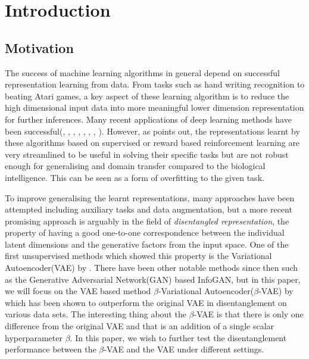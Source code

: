 \chapter{Introduction} \label{ch:introduction}

    \section{Motivation}
        The success of machine learning algorithms in general depend on successful representation learning from data. From tasks such as hand writing recognition\citep{lecun1998gradient} to beating Atari games\citep{mnih2013playing}, a key aspect of these learning algorithm is to reduce the high dimensional input data into more meaningful lower dimension representation for further inferences. Many recent applications of deep learning methods have been successful(\cite{he2016deep}, \cite{szegedy2015going}, \cite{gregor2015draw}, \cite{van2016wavenet}, \cite{van2016conditional}, \cite{mnih2015human}, \cite{jaderberg2016reinforcement}, \cite{silver2016mastering}). However, as \cite{burgess2018understanding} points out, the representations learnt by these algorithms based on supervised or reward based reinforcement learning are very streamlined to be useful in solving their specific tasks but are not robust enough for generalising and domain transfer compared to the biological intelligence\citep{lake2017building}. This can be seen as a form of overfitting to the given task.
        
        To improve generalising the learnt representations, many approaches have been attempted including auxiliary tasks\citep{jaderberg2016reinforcement} and data augmentation\citep{tobin2017domain}, but a more recent promising approach is arguably in the field of \textit{disentangled representation}, the property of having a good one-to-one correspondence between the individual latent dimensions and the generative factors from the input space. One of the first unsupervised methods which showed this property is the Variational Autoencoder(VAE) by \cite{kingma2013auto}. There have been other notable methods since then such as the Generative Adversarial Network(GAN) based InfoGAN\citep{chen2016infogan}, but in this paper, we will focus on the VAE based method $\beta$-Variational Autoencoder($\beta$-VAE) by \cite{higgins2017beta} which has been shown to outperform the original VAE in disentanglement on various data sets. The interesting thing about the $\beta$-VAE is that there is only one difference from the original VAE and that is an addition of a single scalar hyperparameter $\beta$. In this paper, we wish to further test the disentanglement performance between the $\beta$-VAE and the VAE under different settings.
        
